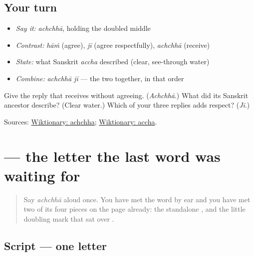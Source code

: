 \subsection*{Your turn}
\begin{itemize}
\raggedright
  \item \emph{Say it:} \emph{achchhā}, holding the doubled middle
  \item \emph{Contrast:} \emph{hāṁ} (agree), \emph{jī} (agree respectfully), \emph{achchhā} (receive)
  \item \emph{State:} what Sanskrit \emph{accha} described (clear, see-through water)
  \item \emph{Combine:} \emph{achchhā jī} — the two together, in that order
\end{itemize}

\begin{tcolorbox}[breakable,colback=teal!4,colframe=teal!35!black,title={Before you move on}]
Give the reply that receives without agreeing. (\emph{Achchhā}.) What did its Sanskrit ancestor describe? (Clear water.) Which of your three replies adds respect? (\emph{Jī}.)

Sources: \href{https://en.wiktionary.org/wiki/\%E0\%A8\%85\%E0\%A9\%B1\%E0\%A8\%9B\%E0\%A8\%BE}{Wiktionary: achchha}; \href{https://en.wiktionary.org/wiki/\%E0\%A4\%85\%E0\%A4\%9A\%E0\%A5\%8D\%E0\%A4\%9B}{Wiktionary: accha}.
\end{tcolorbox}
\section[\texorpdfstring{\pa{ਛ} (chha)}{ਛ (chha)}]{ — the letter the last word was waiting for}

\label{lesson:PA-W09-chhachha}



\begin{quote}
Say \emph{achchhā} aloud once. You have met the word by ear and you have met two of its four pieces on the page already: the standalone \textbf{}, and the little doubling mark \textbf{} that sat over \textbf{}.
\end{quote}

\subsection*{Script — one letter}

